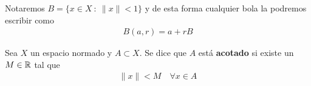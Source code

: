 \begin{notacion}
    Notaremos $B = \{x\in X \ : \ \|x\| < 1\}$ y de esta forma cualquier bola la podremos escribir como 
    \begin{gather*}
        B(a,r) = a + rB
    \end{gather*}
\end{notacion}

\begin{definicion}
    Sea $X$ un espacio normado y $A\subset X$. Se dice que $A$ está \textbf{acotado} si existe un $M\in \mathbb{R}$ tal que 
    \begin{gather*}
        \|x\| < M \quad \forall x \in A
    \end{gather*}
\end{definicion}